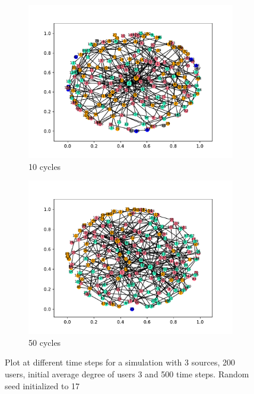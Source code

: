 \begin{figure}[!h]
  \begin{subfigure}[t]{.45\textwidth}
    \centering
    \includegraphics[trim={1cm .5cm 1cm 1cm}, clip, width=\linewidth]{img/pdf/plot-0010.pdf} 
    \caption{10 cycles}
    \label{fig:10}
  \end{subfigure}
  \begin{subfigure}[t]{.45\textwidth}
    \centering
    \includegraphics[trim={1cm .5cm 1cm 1cm}, clip, width=\linewidth]{img/pdf/plot-0050.pdf} 
    \caption{50 cycles}
    \label{fig:50}
  \end{subfigure}
 
  \caption{Plot at different time steps for a simulation with 3 sources, 200 users, initial average degree of users 3 and 500 time steps. Random seed initialized to 17}
\end{figure}


